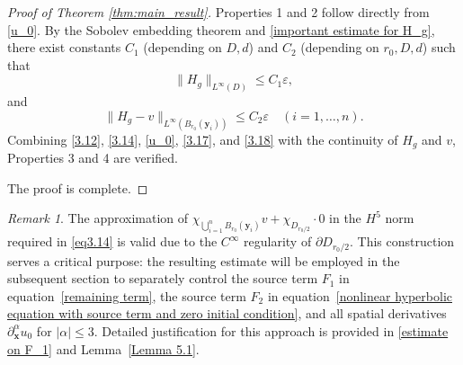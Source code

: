 \documentclass[11pt,reqno,oneside]{amsart}
\numberwithin{equation}{section}
\theoremstyle{definition}
\theoremstyle{remark}
\newtheorem{remark}[theorem]{Remark}
\numberwithin{equation}{section}
\begin{document}
\begin{proof}[Proof of Theorem \ref{thm:main_result}]
		Properties 1 and 2 follow directly from \eqref{u_0}. By the Sobolev embedding theorem and \eqref{important estimate for H_g}, there exist constants $C_1$ (depending on $D, d$) and $C_2$ (depending on $r_0, D, d$) such that
		\begin{equation}\label{3.18}
			\| H_g \|_{L^{\infty}(D)} \leqslant C_1 \varepsilon,
		\end{equation}
		and
		\begin{equation}\label{3.17}
			\| H_g - v \|_{L^{\infty}(B_{r_0}(\mathbf{y}_i))} \leqslant C_2 \varepsilon \quad (i=1,\dots,n).
		\end{equation}	
		Combining \eqref{3.12}, \eqref{3.14}, \eqref{u_0}, \eqref{3.17}, and \eqref{3.18} with the continuity of $H_g$ and $v$, Properties 3 and 4 are verified.
		
		The proof is complete.
	\end{proof}
	
	\begin{remark}
		The approximation of $\chi_{\bigcup_{i=1}^n B_{r_0}(\mathbf{y}_i)} v + \chi_{D_{r_0/2}} \cdot 0$ in the $H^5$ norm required in \eqref{eq3.14} is valid due to the $C^\infty$ regularity of $\partial D_{r_0/2}$. This construction serves a critical purpose: the resulting estimate will be employed in the subsequent section to separately control the source term $F_1$ in equation~\eqref{remaining term},  the source term $F_2$ in equation~\eqref{nonlinear hyperbolic equation with source term and zero initial condition}, and all spatial derivatives $\partial_{\mathbf{x}}^{\alpha} u_0$ for $|\alpha|\leqslant 3$. Detailed justification for this approach is provided in \eqref{estimate on F_1} and Lemma~\ref{Lemma 5.1}.
	\end{remark}
	
\end{document}
